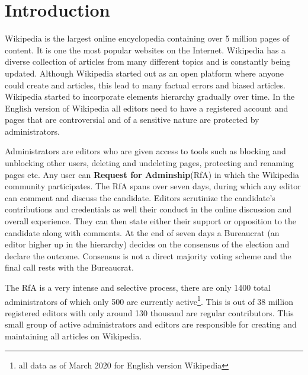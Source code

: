 \section{Introduction}
\label{sec:introduction}

Wikipedia is the largest online encyclopedia containing over 5 million pages of content. It is one the most popular websites on the Internet. Wikipedia has a diverse collection of articles from many different topics and is constantly being updated. Although Wikipedia started out as an open platform where anyone could create and articles, this lead to many factual errors and biased articles. Wikipedia started to incorporate elements hierarchy gradually over time. In the English version of Wikipedia all editors need to have a registered account and pages that are controversial and of a sensitive nature are protected by administrators.
\smallskip

Administrators are editors who are given access to tools such as blocking and unblocking other users, deleting and undeleting pages, protecting and renaming pages etc. Any user can \textbf{Request for Adminship}(RfA) in which the Wikipedia community participates. The RfA spans over seven days, during which any editor can comment and discuss the candidate. Editors scrutinize the candidate's contributions and credentials as well their conduct in the online discussion and overall experience. They can then state either their support or opposition to the candidate along with comments. At the end of seven days a Bureaucrat (an editor higher up in the hierarchy) decides on the consensus of the election and declare the outcome. Consensus is not a direct majority voting scheme and the final call rests with the Bureaucrat.
\smallskip

The RfA is a very intense and selective process, there are only 1400 total administrators of which only 500 are currently active\footnote{all data as of March 2020 for English version Wikipedia}. This is out of 38 million registered editors with only around 130 thousand are regular contributors. This small group of active administrators and editors are responsible for creating and maintaining all articles on Wikipedia.
\smallskip

